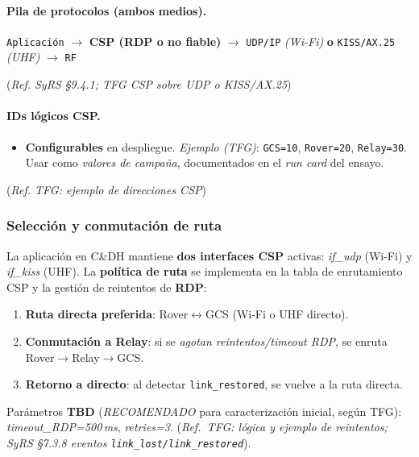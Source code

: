 \paragraph{Pila de protocolos (ambos medios).}
\begin{center}
  \small \verb|Aplicación| $\rightarrow$ \textbf{CSP (RDP o no fiable)} $\rightarrow$
  \verb|UDP/IP| \emph{(Wi-Fi)} \textbf{o} \verb|KISS/AX.25| \emph{(UHF)} $\rightarrow$ \verb|RF|
\end{center}
(\emph{Ref. SyRS §9.4.1; TFG CSP sobre UDP o KISS/AX.25})%

\paragraph{IDs lógicos CSP.}
\begin{itemize}
  \item \textbf{Configurables} en despliegue. \emph{Ejemplo (TFG)}: \texttt{GCS=10}, \texttt{Rover=20}, \texttt{Relay=30}.
        Usar como \emph{valores de campaña}, documentados en el \emph{run card} del ensayo.
\end{itemize}
(\emph{Ref. TFG: ejemplo de direcciones CSP})%

\subsubsection{Selección y conmutación de ruta}
La aplicación en C\&DH mantiene \textbf{dos interfaces CSP} activas: \emph{if\_udp} (Wi-Fi) y \emph{if\_kiss} (UHF).
La \textbf{política de ruta} se implementa en la tabla de enrutamiento CSP y la gestión de reintentos de \textbf{RDP}:
\begin{enumerate}
  \item \textbf{Ruta directa preferida}: Rover$\leftrightarrow$GCS (Wi-Fi o UHF directo).
  \item \textbf{Conmutación a Relay}: si se \emph{agotan reintentos/timeout RDP}, se enruta Rover$\rightarrow$Relay$\rightarrow$GCS.
  \item \textbf{Retorno a directo}: al detectar \texttt{link\_restored}, se vuelve a la ruta directa.
\end{enumerate}
\begin{sloppypar}
Parámetros \textbf{TBD} (\emph{RECOMENDADO} para caracterización inicial, según TFG):
\emph{timeout\_\allowbreak RDP=500\,ms}, \emph{retries=3}.
(\emph{Ref.\ TFG: lógica y ejemplo de reintentos; SyRS §7.3.8 eventos
\texttt{link\_lost/\allowbreak link\_restored}}).
\end{sloppypar}

